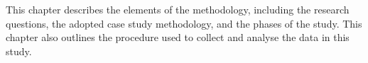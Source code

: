 \documentclass{sig-alternate-05-2015}
\begin{document}
	This chapter describes the elements of the methodology, including the research questions, the adopted case study methodology, and the phases of the study.
	This chapter also outlines the procedure used to collect and analyse the data in this study.







\end{document}
